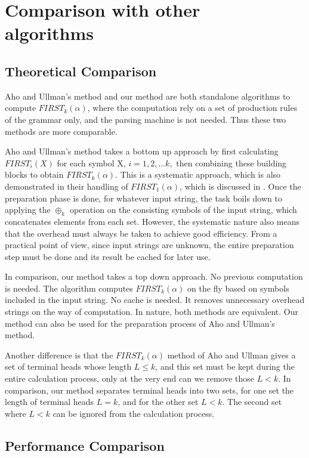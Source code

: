 \documentclass{sig-alternate-05-2015}
\begin{document}
\section{Comparison with other \\ algorithms}
\subsection{Theoretical Comparison}
Aho and Ullman's method and our method are both
standalone algorithms to compute $FIRST_k(\alpha)$, where the
computation rely on a set of production rules of the grammar
only, and the parsing machine is not needed. Thus
these two methods are more comparable.

Aho and Ullman's method takes a bottom up approach
by first calculating $FIRST_i(X)$ for each symbol X, $i = 1, 2,
\ldots k,$ then combining these building blocks to obtain
$FIRST_k(\alpha)$. This is a systematic approach, which is also
demonstrated in their handling of $FIRST_1(\alpha)$, which is
discussed in \cite{aho86compiler}. Once the preparation phase is
done, for whatever input string, the task boils down to
applying the $\oplus_k$ operation on the consisting symbols of
the input string, which concatenates elements from each
set. However, the systematic nature also means that the
overhead must always be taken to achieve good efficiency.
From a practical point of view, since input strings are unknown,
the entire preparation step must be done and its
result be cached for later use.

In comparison, our method takes a top down approach.
No previous computation is needed. The algorithm computes
$FIRST_k(\alpha)$ on the fly based on symbols included in
the input string. No cache is needed. It removes unnecessary
overhead strings on the way of computation.
In nature, both methods are equivalent. Our method can
also be used for the preparation process of Aho and
Ullman's method.

Another difference is that the $FIRST_k(\alpha)$ method of Aho
and Ullman gives a set of terminal heads whose length $L \leq
k$, and this set must be kept during the entire calculation
process, only at the very end can we remove those $L < k$. In
comparison, our method separates terminal heads into two
sets, for one set the length of terminal heads $L = k$, and for
the other set $L < k$. The second set where $L < k$ can be
ignored from the calculation process.


\subsection{Performance Comparison}
\end{document}
